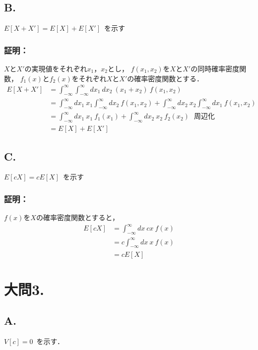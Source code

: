 \documentclass[fleqn]{jsarticle}
\begin{document}
\subsection*{B.}
  $E[X+X'] = E[X] + E[X']$\ を示す

  \subsubsection*{証明：}
    \noindent $X$と$X'$の実現値をそれぞれ$x_1$，$x_2$とし，
    $f(x_1, x_2)$を$X$と$X'$の同時確率密度関数，
    $f_1(x)$と$f_2(x)$をそれぞれ$X$と$X'$の確率密度関数とする．
    \begin{equation*}
      \begin{aligned}
        E[X+X'] &= \int_{-\infty}^{\infty} \int_{-\infty}^{\infty} dx_1\ dx_2\ (x_1 + x_2)\ f(x_1, x_2)\\
        &= \int_{-\infty}^{\infty} dx_1\ x_1\int_{-\infty}^{\infty} dx_2\ f(x_1, x_2) + \int_{-\infty}^{\infty} dx_2\ x_2\int_{-\infty}^{\infty} dx_1\ f(x_1, x_2)\\
        &= \int_{-\infty}^{\infty} dx_1\ x_1\ f_1(x_1) + \int_{-\infty}^{\infty} dx_2\ x_2\ f_2(x_2)\ \ \ 周辺化\\
        &= E[X] + E[X']
      \end{aligned}
    \end{equation*}

\subsection*{C.}
  $E[cX] = cE[X]$\ を示す

  \subsubsection*{証明：}
    \noindent $f(x)$を$X$の確率密度関数とすると，
    \begin{equation*}
      \begin{aligned}
        E[cX] &= \int_{-\infty}^{\infty} dx\ cx\ f(x)\\
        &= c \int_{-\infty}^{\infty} dx\ x\ f(x)\\
        &= cE[X]
      \end{aligned}
    \end{equation*}


\section*{大問3.}
\subsection*{A.}
  $V[c] = 0$\ を示す．
\end{document}
